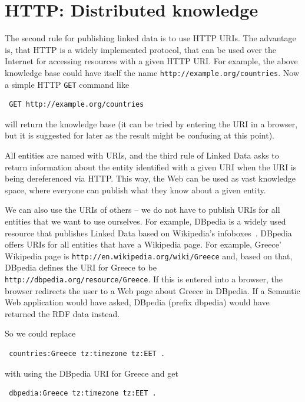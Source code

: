 \section{HTTP: Distributed knowledge}
\label{http}

The second rule for publishing linked data is to use HTTP URIs.
The advantage is, that HTTP is a widely implemented protocol, that can be used over the Internet for accessing resources with a given HTTP URI.
For example, the above knowledge base could have itself the name \texttt{http://example.org/countries}.
Now a simple HTTP \texttt{GET} command like

\begin{verbatim}
 GET http://example.org/countries
\end{verbatim}

will return the knowledge base (it can be tried by entering the URI in a browser, but it is suggested for later as the result might be confusing at this point).

All entities are named with URIs, and the third rule of Linked Data asks to return information about the entity identified with a given URI when the URI is being dereferenced via HTTP.
This way, the Web can be used as vast knowledge space, where everyone can publish what they know about a given entity.

We can also use the URIs of others -- we do not have to publish URIs for all entities that we want to use ourselves.
For example, DBpedia is a widely used resource that publishes Linked Data based on Wikipedia's infoboxes~\cite{dbpedia-swj}.
DBpedia offers URIs for all entities that have a Wikipedia page.
For example, Greece' Wikipedia page is \texttt{http://en.wikipedia.org/wiki/Greece} and, based on that, DBpedia defines the URI for Greece to be \texttt{http://dbpedia.org/resource/Greece}.
If this is entered into a browser, the browser redirects the user to a Web page about Greece in DBpedia.
If a Semantic Web application would have asked, DBpedia (prefix dbpedia) would have returned the RDF data instead.

So we could replace

\begin{verbatim}
 countries:Greece tz:timezone tz:EET .
\end{verbatim}

with using the DBpedia URI for Greece and get

\begin{verbatim}
 dbpedia:Greece tz:timezone tz:EET .
\end{verbatim}

